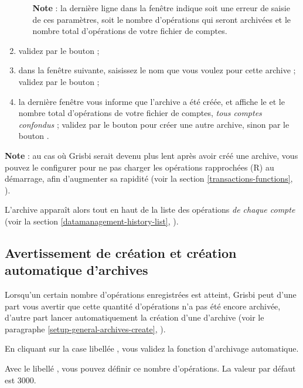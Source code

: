 \begin{enumerate}
\begin{itemize}
			\textbf{Note} : la dernière ligne dans la fenêtre indique soit une erreur de saisie de ces paramètres, soit le nombre d'opérations qui seront archivées et le nombre total d'opérations de votre fichier de comptes.  
		\end{itemize}
	\item validez par le bouton  ;
	\item dans la fenêtre suivante, saisissez le nom que vous voulez pour cette archive ; validez par le bouton  ;
	\item la dernière fenêtre vous informe que l'archive a été créée, et affiche le  et le nombre total d'opérations de votre fichier de comptes, \emph{tous comptes confondus} ; validez par le bouton  pour créer une autre archive, sinon par le bouton .
\end{enumerate}

\textbf{Note} :  au cas où Grisbi serait devenu plus lent après avoir créé une archive, vous pouvez le configurer pour ne pas charger les opérations rapprochées (R) au démarrage, afin d'augmenter sa rapidité (voir la section \ref{transactions-functions}, ).

L'archive apparaît alors tout en haut de la liste des opérations \emph{de chaque compte} (voir la section \vref{datamanagement-history-list}, ).


\subsection{Avertissement de création et création automatique d'archives\label{datamanagement-history-auto}}

Lorsqu'un certain nombre d'opérations enregistrées est atteint, Grisbi peut d'une part vous avertir que cette quantité d'opérations n'a pas été encore archivée, d'autre part lancer automatiquement la création d'une d'archive  (voir le paragraphe \vref{setup-general-archives-create}, ).

En cliquant sur la case libellée , vous validez la fonction d'archivage automatique.

Avec le libellé , vous pouvez définir ce nombre d'opérations. La valeur par défaut est 3000.


